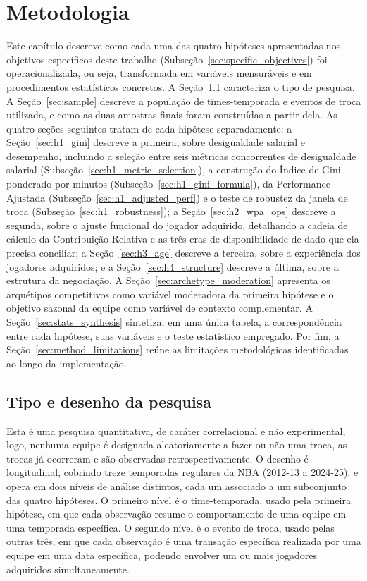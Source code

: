 \chapter{Metodologia}
\label{chp:methodology}

Este capítulo descreve como cada uma das quatro hipóteses apresentadas nos objetivos específicos deste trabalho (Subseção~\ref{sec:specific_objectives}) foi operacionalizada, ou seja, transformada em variáveis mensuráveis e em procedimentos estatísticos concretos. A Seção~\ref{sec:research_design} caracteriza o tipo de pesquisa. A Seção~\ref{sec:sample} descreve a população de times-temporada e eventos de troca utilizada, e como as duas amostras finais foram construídas a partir dela. As quatro seções seguintes tratam de cada hipótese separadamente: a Seção~\ref{sec:h1_gini} descreve a primeira, sobre desigualdade salarial e desempenho, incluindo a seleção entre seis métricas concorrentes de desigualdade salarial (Subseção~\ref{sec:h1_metric_selection}), a construção do Índice de Gini ponderado por minutos (Subseção~\ref{sec:h1_gini_formula}), da Performance Ajustada (Subseção~\ref{sec:h1_adjusted_perf}) e o teste de robustez da janela de troca (Subseção~\ref{sec:h1_robustness}); a Seção~\ref{sec:h2_wpa_ops} descreve a segunda, sobre o ajuste funcional do jogador adquirido, detalhando a cadeia de cálculo da Contribuição Relativa e as três eras de disponibilidade de dado que ela precisa conciliar; a Seção~\ref{sec:h3_age} descreve a terceira, sobre a experiência dos jogadores adquiridos; e a Seção~\ref{sec:h4_structure} descreve a última, sobre a estrutura da negociação. A Seção~\ref{sec:archetype_moderation} apresenta os arquétipos competitivos como variável moderadora da primeira hipótese e o objetivo sazonal da equipe como variável de contexto complementar. A Seção~\ref{sec:stats_synthesis} sintetiza, em uma única tabela, a correspondência entre cada hipótese, suas variáveis e o teste estatístico empregado. Por fim, a Seção~\ref{sec:method_limitations} reúne as limitações metodológicas identificadas ao longo da implementação.

\section{Tipo e desenho da pesquisa}
\label{sec:research_design}

Esta é uma pesquisa quantitativa, de caráter correlacional e não experimental, logo, nenhuma equipe é designada aleatoriamente a fazer ou não uma troca, as trocas já ocorreram e são observadas retrospectivamente. O desenho é longitudinal, cobrindo treze temporadas regulares da NBA (2012-13 a 2024-25), e opera em dois níveis de análise distintos, cada um associado a um subconjunto das quatro hipóteses. O primeiro nível é o time-temporada, usado pela primeira hipótese, em que cada observação resume o comportamento de uma equipe em uma temporada específica. O segundo nível é o evento de troca, usado pelas outras três, em que cada observação é uma transação específica realizada por uma equipe em uma data específica, podendo envolver um ou mais jogadores adquiridos simultaneamente.

